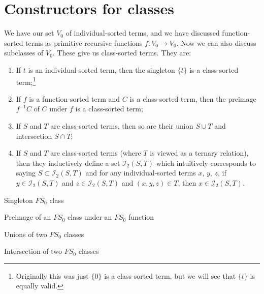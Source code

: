 \section*{Constructors for classes}

\begin{node}
We have our set $V_{0}$ of individual-sorted terms, and we have
discussed function-sorted terms as primitive recursive functions
$f\colon V_{0}\to V_{0}$. Now we can also discuss subclasses of
$V_{0}$. These give us class-sorted terms. They are:
\begin{enumerate}
\item If $t$ is an individual-sorted term, then the singleton $\{t\}$
  is a class-sorted term;\footnote{Originally this was just $\{0\}$ is
  a class-sorted term, but we will see that $\{t\}$ is equally valid.}
\item If $f$ is a function-sorted term and $C$ is a class-sorted term,
  then the preimage $f^{-1}C$ of $C$ under $f$ is a class-sorted term;
\item If $S$ and $T$ are class-sorted terms, then so are their union
  $S\cup T$ and intersection $S\cap T$;
\item If $S$ and $T$ are class-sorted terms (where $T$ is viewed as a
  ternary relation), then they inductively define a set
  $\mathcal{I}_{2}(S,T)$ which intuitively corresponds to saying
  $S\subset \mathcal{I}_{2}(S,T)$ and for any individual-sorted terms
  $x$, $y$, $z$, if $y\in\mathcal{I}_{2}(S,T)$ and $z\in\mathcal{I}_{2}(S,T)$
  and $(x,y,z)\in T$, then $x\in\mathcal{I}_{2}(S,T)$.
\end{enumerate}
\end{node}

\nwenddocs{}\endmoddef\nwstartdeflinemarkup{}\nwenddeflinemarkup
\LA{}Singleton $FS_{0}$ class~{\nwtagstyle{}}\RA{}

\LA{}Preimage of an $FS_{0}$ class under an $FS_{0}$ function~{\nwtagstyle{}}\RA{}

\LA{}Unions of two $FS_{0}$ classes~{\nwtagstyle{}}\RA{}

\LA{}Intersection of two $FS_{0}$ classes~{\nwtagstyle{}}\RA{}

